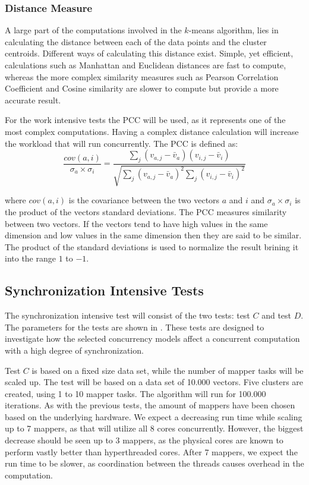 \subsubsection{Distance Measure}
A large part of the computations involved in the $k$-means algorithm, lies in calculating the distance between each of the data points and the cluster centroids. Different ways of calculating this distance exist. Simple, yet efficient, calculations such as Manhattan and Euclidean\cite[p. 41]{amatriain2011data} distances are fast to compute, whereas the more complex similarity measures such as Pearson Correlation Coefficient and Cosine similarity\cite[p. 42]{amatriain2011data}\cite{breese1998empirical} are slower to compute but provide a more accurate result.

For the work intensive tests the \ac{PCC} will be used, as it represents one of the most complex computations. Having a complex distance calculation will increase the workload that will run concurrently. The \ac{PCC} is defined as\cite[p. 4]{breese1998empirical}:
\begin{equation}\label{pearsonverbose}
\frac{cov(a,i)}{\sigma_a \times \sigma_i} = \frac{\sum_j(v_{a,j}-\bar{v}_a)(v_{i,j}-\bar{v}_i)}{\sqrt{{\sum_j}(v_{a,j}-\bar{v}_a)^2 \sum_j(v_{i,j}-\bar{v}_i)^2}}
\end{equation}

where $cov(a,i)$ is the covariance between the two vectors $a$ and $i$ and $\sigma_a \times \sigma_i$ is the product of the vectors standard deviations. The \ac{PCC} measures similarity between two vectors. If the vectors tend to have high values in the same dimension and low values in the same dimension then they are said to be similar. The product of the standard deviations is used to normalize the result brining it into the range $1$ to $-1$. 

\subsection{Synchronization Intensive Tests}
\label{sec:performance_sync_intensive_desc}
The synchronization intensive test will consist of the two tests: test $C$ and test $D$. The parameters for the tests are shown in . These tests are designed to investigate how the selected concurrency models affect a concurrent computation with a high degree of synchronization. 

Test $C$ is based on a fixed size data set, while the number of mapper tasks will be scaled up.  The test will be based on a data set of 10.000 vectors. Five clusters are created, using 1 to 10 mapper tasks. The algorithm will run for 100.000 iterations. As with the previous tests, the amount of mappers have been chosen based on the underlying hardware. We expect a decreasing run time while scaling up to 7 mappers, as that will utilize all 8 cores concurrently. However, the biggest decrease should be seen up to 3 mappers, as the physical cores are known to perform vastly better than hyperthreaded cores\cite{marr2002hyper}. After 7 mappers, we expect the run time to be slower, as coordination between the threads causes overhead in the computation.

